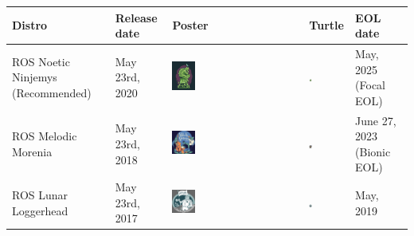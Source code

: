 \documentclass[../../main]{subfiles}
\begin{document}
\begin{table}[h]
\begin{tcolorbox}[
    colback=red!5!white,colframe=red!75!black,
    title={\textbf{Built-in Field Types for Message Definition}},
    fonttitle=\bfseries, coltitle=white, width=\linewidth
]
    \centering
    \renewcommand{\arraystretch}{1} %
    \begin{longtable}{|
        >{\centering\arraybackslash}m{2.5cm}|
        >{\centering\arraybackslash}m{2cm}|
        >{\centering\arraybackslash}m{3cm}|
        >{\centering\arraybackslash}m{1.5cm}|
        >{\centering\arraybackslash}m{3cm}|}
    \hline 
    \rowcolor{red!20}
    \textbf{Distro} & \textbf{Release date} & \textbf{Poster} & \textbf{Turtle} & \textbf{EOL date} \\
    \hline \midrule

    ROS Noetic Ninjemys (Recommended) & May 23rd, 2020 & 
    \includegraphics[width=0.18\textwidth]{img/noetic.png} & 
    \includegraphics[width=0.08\textwidth]{img/noetic_c.png} & 
    May, 2025 (Focal EOL) \\ \hline

    ROS Melodic Morenia & May 23rd, 2018 & 
    \includegraphics[width=0.18\textwidth]{img/melodic_with_bg.png} & 
    \includegraphics[width=0.08\textwidth]{img/melodic.png} & 
    June 27, 2023 (Bionic EOL) \\ \hline

    ROS Lunar Loggerhead & May 23rd, 2017 & 
    \includegraphics[width=0.18\textwidth]{img/lunar_with_bg.png} & 
    \includegraphics[width=0.08\textwidth]{img/lunar.png} & 
    May, 2019 \\ \hline


\end{longtable}
\end{tcolorbox}
\end{table}
\end{document}
